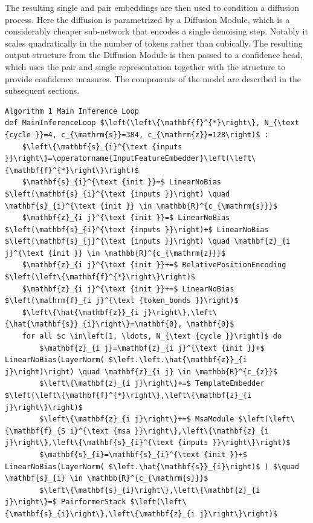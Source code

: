 \documentclass[10pt]{article}
\begin{document}
The resulting single and pair embeddings are then used to condition a diffusion process. Here the diffusion is parametrized by a Diffusion Module, which is a considerably cheaper sub-network that encodes a single denoising step. Notably it scales quadratically in the number of tokens rather than cubically. The resulting output structure from the Diffusion Module is then passed to a confidence head, which uses the pair and single representation together with the structure to provide confidence measures. The components of the model are described in the subsequent sections.

\begin{verbatim}
Algorithm 1 Main Inference Loop
def MainInferenceLoop $\left(\left\{\mathbf{f}^{*}\right\}, N_{\text {cycle }}=4, c_{\mathrm{s}}=384, c_{\mathrm{z}}=128\right)$ :
    $\left\{\mathbf{s}_{i}^{\text {inputs }}\right\}=\operatorname{InputFeatureEmbedder}\left(\left\{\mathbf{f}^{*}\right\}\right)$
    $\mathbf{s}_{i}^{\text {init }}=$ LinearNoBias $\left(\mathbf{s}_{i}^{\text {inputs }}\right) \quad \mathbf{s}_{i}^{\text {init }} \in \mathbb{R}^{c_{\mathrm{s}}}$
    $\mathbf{z}_{i j}^{\text {init }}=$ LinearNoBias $\left(\mathbf{s}_{i}^{\text {inputs }}\right)+$ LinearNoBias $\left(\mathbf{s}_{j}^{\text {inputs }}\right) \quad \mathbf{z}_{i j}^{\text {init }} \in \mathbb{R}^{c_{\mathrm{z}}}$
    $\mathbf{z}_{i j}^{\text {init }}+=$ RelativePositionEncoding $\left(\left\{\mathbf{f}^{*}\right\}\right)$
    $\mathbf{z}_{i j}^{\text {init }}+=$ LinearNoBias $\left(\mathrm{f}_{i j}^{\text {token_bonds }}\right)$
    $\left\{\hat{\mathbf{z}}_{i j}\right\},\left\{\hat{\mathbf{s}}_{i}\right\}=\mathbf{0}, \mathbf{0}$
    for all $c \in\left[1, \ldots, N_{\text {cycle }}\right]$ do
        $\mathbf{z}_{i j}=\mathbf{z}_{i j}^{\text {init }}+$ LinearNoBias(LayerNorm( $\left.\left.\hat{\mathbf{z}}_{i j}\right)\right) \quad \mathbf{z}_{i j} \in \mathbb{R}^{c_{z}}$
        $\left\{\mathbf{z}_{i j}\right\}+=$ TemplateEmbedder $\left(\left\{\mathbf{f}^{*}\right\},\left\{\mathbf{z}_{i j}\right\}\right)$
        $\left\{\mathbf{z}_{i j}\right\}+=$ MsaModule $\left(\left\{\mathbf{f}_{S i}^{\text {msa }}\right\},\left\{\mathbf{z}_{i j}\right\},\left\{\mathbf{s}_{i}^{\text {inputs }}\right\}\right)$
        $\mathbf{s}_{i}=\mathbf{s}_{i}^{\text {init }}+$ LinearNoBias(LayerNorm( $\left.\hat{\mathbf{s}}_{i}\right)$ ) $\quad \mathbf{s}_{i} \in \mathbb{R}^{c_{\mathrm{s}}}$
        $\left\{\mathbf{s}_{i}\right\},\left\{\mathbf{z}_{i j}\right\}=$ PairformerStack $\left(\left\{\mathbf{s}_{i}\right\},\left\{\mathbf{z}_{i j}\right\}\right)$

\end{verbatim}
\end{document}
